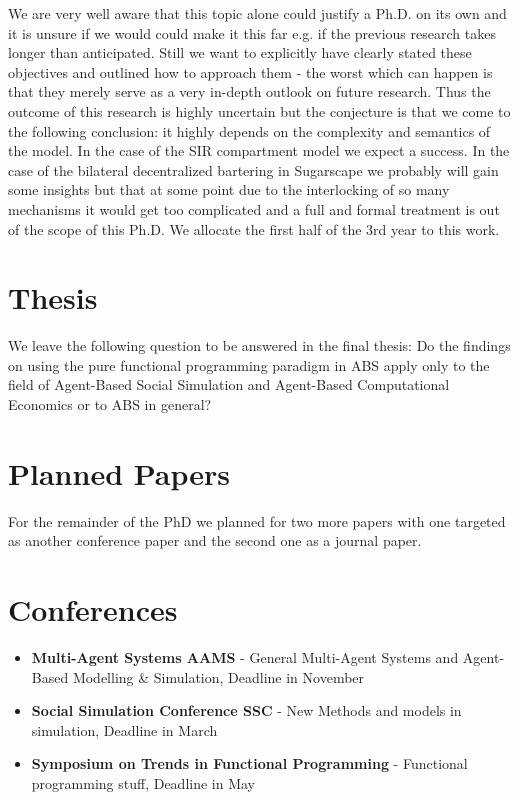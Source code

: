 We are very well aware that this topic alone could justify a Ph.D. on its own and it is unsure if we would could make it this far e.g. if the previous research takes longer than anticipated. Still we want to explicitly have clearly stated these objectives and outlined how to approach them - the worst which can happen is that they merely serve as a very in-depth outlook on future research.
Thus the outcome of this research is highly uncertain but the conjecture is that we come to the following conclusion: it highly depends on the complexity and semantics of the model. In the case of the SIR compartment model we expect a success. In the case of the bilateral decentralized bartering in Sugarscape we probably will gain some insights but that at some point due to the interlocking of so many mechanisms it would get too complicated and a full and formal treatment is out of the scope of this Ph.D.
We allocate the first half of the 3rd year to this work.

\section{Thesis}
We leave the following question to be answered in the final thesis:
Do the findings on using the pure functional programming paradigm in ABS apply only to the field of Agent-Based Social Simulation and Agent-Based Computational Economics or to ABS in general?

\section{Planned Papers}
For the remainder of the PhD we planned for two more papers with one targeted as another conference paper and the second one as a journal paper.

\section{Conferences}
\begin{itemize}
	\item \textbf{Multi-Agent Systems AAMS} - General Multi-Agent Systems and Agent-Based Modelling \& Simulation, Deadline in November
	\item \textbf{Social Simulation Conference SSC} - New Methods and models in simulation, Deadline in March
	\item \textbf{Symposium on Trends in Functional Programming} - Functional programming stuff, Deadline in May
\end{itemize}

